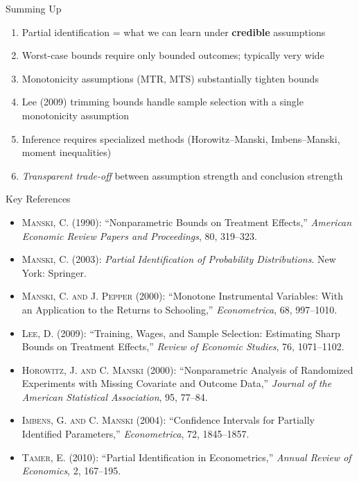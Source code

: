 \documentclass[10pt]{beamer}
\begin{document}
\begin{frame}{Summing Up}
  \begin{enumerate}
    \item Partial identification = what we can learn under \textbf{credible} assumptions
    \vspace{0.15cm}
    \item Worst-case bounds require only bounded outcomes; typically very wide
    \vspace{0.15cm}
    \item Monotonicity assumptions (MTR, MTS) substantially tighten bounds
    \vspace{0.15cm}
    \item Lee (2009) trimming bounds handle sample selection with a single monotonicity assumption
    \vspace{0.15cm}
    \item Inference requires specialized methods (Horowitz--Manski, Imbens--Manski, moment inequalities)
    \vspace{0.15cm}
    \item \textit{Transparent trade-off} between assumption strength and conclusion strength
  \end{enumerate}
\end{frame}

\begin{frame}{Key References}
  \begin{itemize}
    \footnotesize
    \item \textsc{Manski, C.} (1990): ``Nonparametric Bounds on Treatment Effects,'' \textit{American Economic Review Papers and Proceedings}, 80, 319--323.
    \item \textsc{Manski, C.} (2003): \textit{Partial Identification of Probability Distributions}. New York: Springer.
    \item \textsc{Manski, C. and J. Pepper} (2000): ``Monotone Instrumental Variables: With an Application to the Returns to Schooling,'' \textit{Econometrica}, 68, 997--1010.
    \item \textsc{Lee, D.} (2009): ``Training, Wages, and Sample Selection: Estimating Sharp Bounds on Treatment Effects,'' \textit{Review of Economic Studies}, 76, 1071--1102.
    \item \textsc{Horowitz, J. and C. Manski} (2000): ``Nonparametric Analysis of Randomized Experiments with Missing Covariate and Outcome Data,'' \textit{Journal of the American Statistical Association}, 95, 77--84.
    \item \textsc{Imbens, G. and C. Manski} (2004): ``Confidence Intervals for Partially Identified Parameters,'' \textit{Econometrica}, 72, 1845--1857.
    \item \textsc{Tamer, E.} (2010): ``Partial Identification in Econometrics,'' \textit{Annual Review of Economics}, 2, 167--195.
  \end{itemize}
\end{frame}
\end{document}

